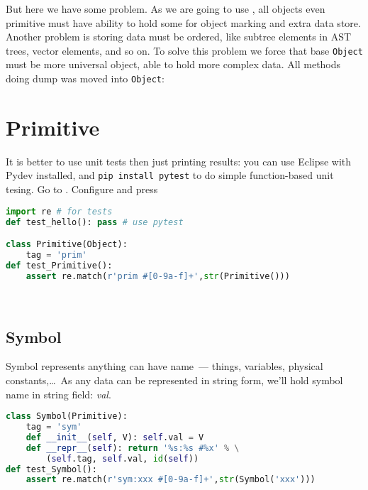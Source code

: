 But here we have some problem. As we are going to use ,
all objects even primitive must have ability to hold some  for
object marking and extra data store. Another problem is storing data must be
ordered, like subtree elements in AST trees, vector elements, and so on. To
solve this problem we force that base \verb|Object| must be more universal
object, able to hold more complex data.
All methods doing dump was moved into \verb|Object|:\\


\section{Primitive}

It is better to use unit tests then just printing results: you can use Eclipse
with Pydev installed, and \verb|pip install pytest| to do simple function-based
unit tesing. Go to
. Configure  and press

\bigskip
\begin{lstlisting}[language=Python]
import re # for tests
def test_hello(): pass # use pytest

class Primitive(Object):
    tag = 'prim'
def test_Primitive():
    assert re.match(r'prim #[0-9a-f]+',str(Primitive()))
\end{lstlisting}

\ \\

\subsection{Symbol}

Symbol represents anything can have name\ --- things, variables,
physical constants,\ldots\ As any data can be represented in string form, we'll
hold symbol name in string field: \emph{val}.


\begin{lstlisting}[language=Python]
class Symbol(Primitive):
    tag = 'sym'
    def __init__(self, V): self.val = V
    def __repr__(self): return '%s:%s #%x' % \
    	(self.tag, self.val, id(self))
def test_Symbol():
    assert re.match(r'sym:xxx #[0-9a-f]+',str(Symbol('xxx')))
\end{lstlisting}

